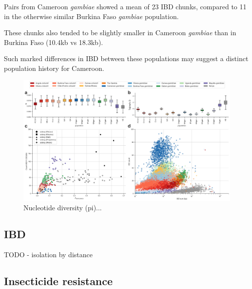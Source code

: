 \documentclass[a4paper,11pt,abstracton,hidelinks]{scrartcl}
\begin{document}
Pairs from Cameroon \emph{gambiae} showed a mean of 23 IBD chunks, compared to 11 in the otherwise similar Burkina Faso \emph{gambiae} population.

These chunks also tended to be slightly smaller in Cameroon \emph{gambiae} than in Burkina Faso (10.4kb vs 18.3kb). 

Such marked differences in IBD between these populations may suggest a distinct population history for Cameroon.

\begin{figure}[H]
	\begin{center}
		\includegraphics*[width=6.3in]{artwork/diversity_composite.jpeg}
	\end{center}
	\caption{Nucleotide diversity (pi)...}
	\label{div}
\end{figure}


\subsection*{IBD}
TODO - isolation by distance 


\subsection*{Insecticide resistance}
\end{document}
